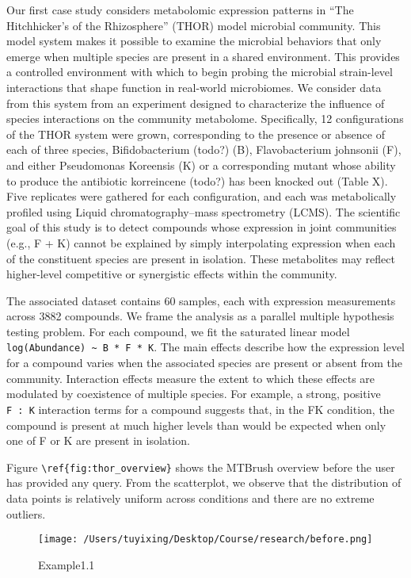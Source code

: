 \documentclass[
]{article}
\begin{document}
Our first case study considers metabolomic expression patterns in ``The
Hitchhicker's of the Rhizosphere'' (THOR) model microbial community.
This model system makes it possible to examine the microbial behaviors
that only emerge when multiple species are present in a shared
environment. This provides a controlled environment with which to begin
probing the microbial strain-level interactions that shape function in
real-world microbiomes. We consider data from this system from an
experiment designed to characterize the influence of species
interactions on the community metabolome. Specifically, 12
configurations of the THOR system were grown, corresponding to the
presence or absence of each of three species, Bifidobacterium (todo?)
(B), Flavobacterium johnsonii (F), and either Pseudomonas Koreensis (K)
or a corresponding mutant whose ability to produce the antibiotic
korreincene (todo?) has been knocked out (Table X). Five replicates were
gathered for each configuration, and each was metabolically profiled
using Liquid chromatography--mass spectrometry (LCMS). The scientific
goal of this study is to detect compounds whose expression in joint
communities (e.g., F + K) cannot be explained by simply interpolating
expression when each of the constituent species are present in
isolation. These metabolites may reflect higher-level competitive or
synergistic effects within the community.

The associated dataset contains 60 samples, each with expression
measurements across 3882 compounds. We frame the analysis as a parallel
multiple hypothesis testing problem. For each compound, we fit the
saturated linear model
\texttt{log(Abundance)\ \textasciitilde{}\ B\ *\ F\ *\ K}. The main
effects describe how the expression level for a compound varies when the
associated species are present or absent from the community. Interaction
effects measure the extent to which these effects are modulated by
coexistence of multiple species. For example, a strong, positive
\texttt{F\ :\ K} interaction terms for a compound suggests that, in the
FK condition, the compound is present at much higher levels than would
be expected when only one of F or K are present in isolation.

Figure \texttt{\textbackslash{}ref\{fig:thor\_overview\}} shows the
MTBrush overview before the user has provided any query. From the
scatterplot, we observe that the distribution of data points is
relatively uniform across conditions and there are no extreme outliers.

\begin{figure}
\centering
\texttt{[image: /Users/tuyixing/Desktop/Course/research/before.png]}
\caption{Example1.1}
\end{figure}
\end{document}
